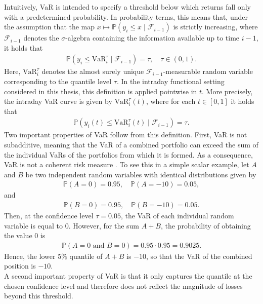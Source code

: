 \documentclass[12pt,a4paper]{article}
\theoremstyle{definition}
\begin{document}
Intuitively, VaR is intended to specify a threshold below which returns fall only with a predetermined probability. In probability terms, this means that, under the assumption that the map $x\mapsto \mathbb{P}(y_i\leq x\mid\mathcal{F}_{i-1})$ is strictly increasing, where $\mathcal{F}_{i-1}$ denotes the $\sigma$-algebra containing the information available up to time $i-1$, it holds that
\begin{gather}
    \mathbb{P}(y_i\leq \mathrm{VaR}_i^\tau \mid \mathcal{F}_{i-1})=\tau, \quad \tau\in(0,1).
\end{gather}
Here, $\mathrm{VaR}_i^\tau$ denotes the almost surely unique $\mathcal{F}_{i-1}$-measurable random variable corresponding to the quantile level $\tau$. In the intraday functional setting considered in this thesis, this definition is applied pointwise in $t$. More precisely, the intraday VaR curve is given by $\mathrm{VaR}_i^\tau(t)$, where for each $t\in[0,1]$ it holds that
\begin{gather}
    \mathbb{P}(y_i(t)\leq \mathrm{VaR}_i^\tau(t)\mid\mathcal{F}_{i-1})=\tau.
\end{gather}
Two important properties of VaR follow from this definition. First, VaR is not subadditive, meaning that the VaR of a combined portfolio can exceed the sum of the individual VaRs of the portfolios from which it is formed. As a consequence, VaR is not a coherent risk measure \citep{Artzner1999}. To see this in a simple scalar example, let $A$ and $B$ be two independent random variables with identical distributions given by
\begin{gather}
    \mathbb{P}(A=0)=0.95,\quad \mathbb{P}(A=-10)=0.05,
\end{gather}
and
\begin{gather}
    \mathbb{P}(B=0)=0.95,\quad \mathbb{P}(B=-10)=0.05.
\end{gather}
Then, at the confidence level $\tau=0.05$, the VaR of each individual random variable is equal to $0$. However, for the sum $A+B$, the probability of obtaining the value $0$ is
\begin{gather}
    \mathbb{P}(A=0 \text{ and } B=0)=0.95\cdot 0.95=0.9025.
\end{gather}
Hence, the lower $5\%$ quantile of $A+B$ is $-10$, so that the VaR of the combined position is $-10$.\\
A second important property of VaR is that it only captures the quantile at the chosen confidence level and therefore does not reflect the magnitude of losses beyond this threshold.
\end{document}
